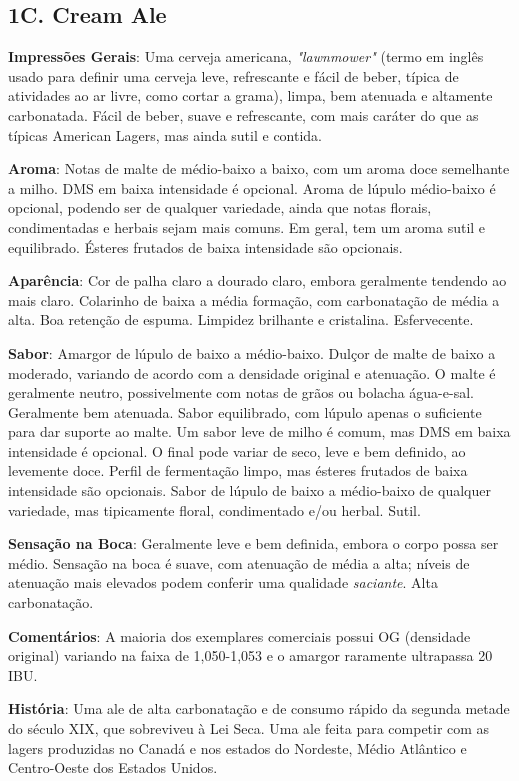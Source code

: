 \subsection*{1C. Cream Ale}
\textbf{Impressões Gerais}: Uma cerveja americana, \textit{"lawnmower"} (termo em inglês usado para definir uma cerveja leve, refrescante e fácil de beber, típica de atividades ao ar livre, como cortar a grama), limpa, bem atenuada e altamente carbonatada. Fácil de beber, suave e refrescante, com mais caráter do que as típicas American Lagers, mas ainda sutil e contida.

\textbf{Aroma}: Notas de malte de médio-baixo a baixo, com um aroma doce semelhante a milho. DMS em baixa intensidade é opcional. Aroma de lúpulo médio-baixo é opcional, podendo ser de qualquer variedade, ainda que notas florais, condimentadas e herbais sejam mais comuns. Em geral, tem um aroma sutil e equilibrado. Ésteres frutados de baixa intensidade são opcionais.

\textbf{Aparência}: Cor de palha claro a dourado claro, embora geralmente tendendo ao mais claro. Colarinho de baixa a média formação, com carbonatação de média a alta. Boa retenção de espuma. Limpidez brilhante e cristalina. Esfervecente.

\textbf{Sabor}: Amargor de lúpulo de baixo a médio-baixo. Dulçor de malte de baixo a moderado, variando de acordo com a densidade original e atenuação. O malte é geralmente neutro, possivelmente com notas de grãos ou bolacha água-e-sal. Geralmente bem atenuada. Sabor equilibrado, com lúpulo apenas o suficiente para dar suporte ao malte. Um sabor leve de milho é comum, mas DMS em baixa intensidade é opcional. O final pode variar de seco, leve e bem definido, ao levemente doce. Perfil de fermentação limpo, mas ésteres frutados de baixa intensidade são opcionais. Sabor de lúpulo de baixo a médio-baixo de qualquer variedade, mas tipicamente floral, condimentado e/ou herbal. Sutil.

\textbf{Sensação na Boca}: Geralmente leve e bem definida, embora o corpo possa ser médio. Sensação na boca é suave, com atenuação de média a alta; níveis de atenuação mais elevados podem conferir uma qualidade \textit{saciante}. Alta carbonatação.

\textbf{Comentários}: A maioria dos exemplares comerciais possui OG (densidade original) variando na faixa de 1,050-1,053 e o amargor raramente ultrapassa 20 IBU.

\textbf{História}: Uma ale de alta carbonatação e de consumo rápido da segunda metade do século XIX, que sobreviveu à Lei Seca. Uma ale feita para competir com as lagers produzidas no Canadá e nos estados do Nordeste, Médio Atlântico e Centro-Oeste dos Estados Unidos.

